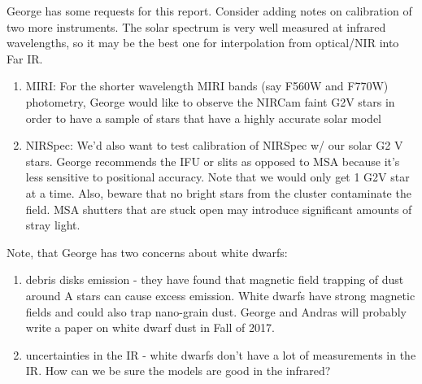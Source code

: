 \documentclass{aastex6}
\begin{document}
George has some requests for this report.
Consider adding notes on calibration of two more instruments.
The solar spectrum is very well measured at infrared wavelengths, so it may be the best one for interpolation from optical/NIR into Far IR.
\begin{enumerate}
	\item MIRI: For the shorter wavelength MIRI bands (say F560W and F770W) photometry, George would like to observe the NIRCam faint G2V stars in order to have a sample of stars that have a highly accurate solar model
	\item NIRSpec: We'd also want to test calibration of NIRSpec w/ our solar G2 V stars.
George recommends the IFU or slits as opposed to MSA because it's less sensitive to positional accuracy.
Note that we would only get 1 G2V star at a time.
Also, beware that no bright stars from the cluster contaminate the field. MSA shutters that are stuck open may introduce significant amounts of stray light.
\end{enumerate}
Note, that George has two concerns about white dwarfs:
\begin{enumerate}
	\item debris disks emission - they have found that magnetic field trapping of dust around A stars can cause excess emission.
White dwarfs have strong magnetic fields and could also trap nano-grain dust.
George and Andras will probably write a paper on white dwarf dust in Fall of 2017.
	\item uncertainties in the IR - white dwarfs don't have a lot of measurements in the IR.
How can we be sure the models are good in the infrared?
\end{enumerate}



\end{document}
